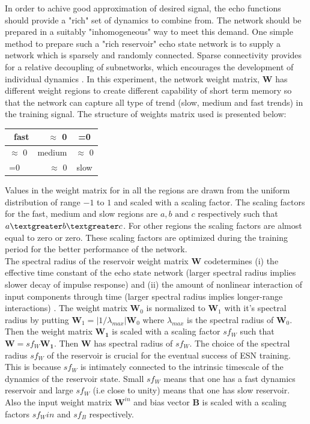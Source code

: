 In order to achive good approximation of desired signal, the echo functions should provide a "rich" set of dynamics to combine from. The network should be prepared in a suitably "inhomogeneous" way to meet this demand. One simple method to prepare such a "rich reservoir" echo state network is to supply a network which is sparsely and randomly connected. Sparse connectivity provides for a relative decoupling of subnetworks, which encourages the development of individual dynamics \cite{shortTermMemory}. In this experiment, the network weight matrix, $\mathbf{W}$ has different weight regions to create different capability of short term memory so that the network can capture all type of trend (slow, medium and fast trends) in the training signal. The structure of weights matrix used is presented below:\\
      \begin{center}
	  \begin{tabular}{|l|r|c|}\hline
		  \
		  fast & $\approx$ 0 & =0 \\[5ex] \hline
		  $\approx$ 0 & medium & $\approx$ 0 \\[5ex] \hline
		  =0 & $\approx$ 0 & slow \\[5ex] \hline 
	  \end{tabular}	  
	  \end{center}
Values in the weight matrix for in all the regions are drawn from the uniform distribution of range $-1$ to $1$ and scaled with a scaling factor. The scaling factors for the fast, medium and slow regions are $a, b \text{ and } c$ respectively such that $a \textgreater b \textgreater c$. For other regions the scaling factors are almost equal to zero or zero. These scaling factors are optimized during the training period for the better performance of the network.\\
The spectral radius of the reservoir weight matrix \textbf{W} codetermines (i) the effective time constant of the echo state network (larger spectral radius implies slower decay of impulse response) and (ii) the amount of nonlinear interaction of input components through time (larger spectral radius implies longer-range interactions) \cite{Jaeger:2007}.
  The weight matrix $\mathbf{W}_0$ is normalized to  $\mathbf{W}_1$ with it's spectral radius  by putting $\mathbf{W}_1 = \left| 1/\lambda _{max}\right| \mathbf{W}_0$ where $\lambda _{max}$ is the spectral radius of $\mathbf{W}_0$. Then the weight matrix $\mathbf{W_1}$ is scaled with a scaling factor $sf_W$ such that $\mathbf{W} = sf_W \mathbf{W_1}$. Then $\mathbf{W}$ has spectral radius of $sf_W$. The choice of the spectral radius $sf_W$ of the reservoir is crucial for the eventual success of ESN training. This is because $sf_W$ is  intimately connected to the intrinsic timescale of the dynamics of the reservoir state. Small $sf_W$ means that one has a fast dynamics reservoir and large $sf_W$ (i.e close to unity) means that one has slow reservoir. Also the input weight matrix $\mathbf{W}^{in}$  and bias vector $\mathbf{B}$ is scaled with a scaling factors $sf_Win$ and $sf_B$ respectively. 

